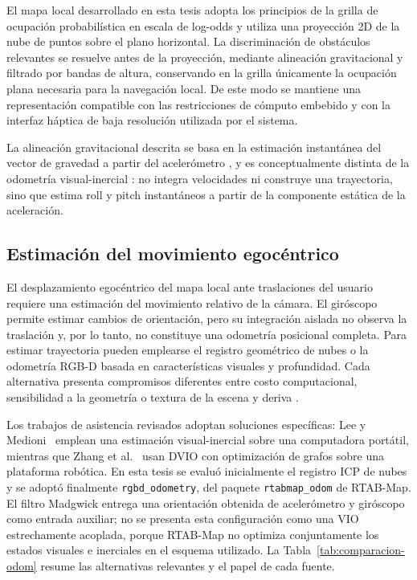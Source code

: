 El mapa local desarrollado en esta tesis adopta los principios de la grilla de ocupación
probabilística en escala de log-odds y utiliza una proyección 2D de la nube de puntos sobre el
plano horizontal. La discriminación de obstáculos relevantes se resuelve antes de la proyección,
mediante alineación gravitacional y filtrado por bandas de altura, conservando en la grilla
únicamente la ocupación plana necesaria para la navegación local. De este modo se mantiene una
representación compatible con las restricciones de cómputo embebido y con la interfaz háptica de
baja resolución utilizada por el sistema.

La alineación gravitacional descrita se basa en la estimación instantánea del vector de gravedad a
partir del acelerómetro \cite{Woodman2007}, y es conceptualmente distinta de la odometría
visual-inercial \cite{Forster2017, Mourikis2007, Qin2018}: no integra velocidades ni construye una
trayectoria, sino que estima roll y pitch instantáneos a partir de la componente estática de la
aceleración.

\subsection{Estimación del movimiento egocéntrico}
\label{subsec:ea-odometria}

El desplazamiento egocéntrico del mapa local ante traslaciones del usuario requiere una estimación
del movimiento relativo de la cámara. El giróscopo permite estimar cambios de orientación, pero su
integración aislada no observa la traslación y, por lo tanto, no constituye una odometría posicional
completa. Para estimar trayectoria pueden emplearse el registro geométrico de nubes o la odometría
RGB-D basada en características visuales y profundidad. Cada alternativa presenta compromisos
diferentes entre costo computacional, sensibilidad a la geometría o textura de la escena y deriva
\cite{Labbe2019RTAB, Woodman2007}.

Los trabajos de asistencia revisados adoptan soluciones específicas: Lee y Medioni~\cite{Lee2016RGBD}
emplean una estimación visual-inercial sobre una computadora portátil, mientras que Zhang et
al.~\cite{Zhang2021DVIO} usan DVIO con optimización de grafos sobre una plataforma robótica. En esta
tesis se evaluó inicialmente el registro ICP de nubes y se adoptó finalmente
\texttt{rgbd\_odometry}, del paquete \texttt{rtabmap\_odom} de RTAB-Map. El filtro Madgwick entrega
una orientación obtenida de acelerómetro y giróscopo como entrada auxiliar; no se presenta esta
configuración como una VIO estrechamente acoplada, porque RTAB-Map no optimiza conjuntamente los
estados visuales e inerciales en el esquema utilizado. La Tabla~\ref{tab:comparacion-odom} resume
las alternativas relevantes y el papel de cada fuente.

